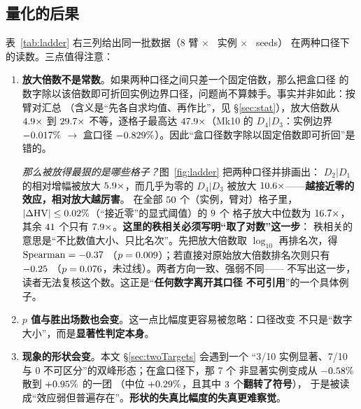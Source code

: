 \documentclass[UTF8, a4paper, 11pt]{ctexart}
\newcommand{\hv}{\mathrm{HV}}
\begin{document}
\subsection{量化的后果}\label{sec:boxeffect}
表~\ref{tab:ladder} 右三列给出同一批数据（8 臂 $\times$ \DevN\ 实例 $\times$ \SetSeeds\ seeds）
在两种口径下的读数。三点值得注意：

\begin{enumerate}\itemsep4pt
  \item \textbf{放大倍数不是常数}。如果两种口径之间只差一个固定倍数，那么把盒口径
        的数字除以该倍数即可折回实例边界口径，问题尚不算棘手。事实并非如此：按臂对汇总
        （含义是“先各自求均值、再作比”，见 \S\ref{sec:stat}），放大倍数从
        $4.9\times$ 到 $29.7\times$ 不等，逐格子最高达
        $47.9\times$（Mk10 的 $D_4|D_3$：实例边界 $-0.017\%$
        $\to$ 盒口径 $-0.829\%$）。因此“盒口径数字除以固定倍数即可折回”是错的。

        \emph{那么被放得最狠的是哪些格子？}图~\ref{fig:ladder} 把两种口径并排画出：
        $D_2|D_1$ 的相对增幅被放大 $5.9\times$，而几乎为零的 $D_4|D_3$
        被放大 $10.6\times$——\textbf{越接近零的效应，相对放大越厉害}。
        在全部 $50$ 个（实例，臂对）格子里，
        $|\Delta \hv|\le \CalibSmallThr\%$（“接近零”的显式阈值）的 $9$ 个
        格子放大中位数为 $16.7\times$，其余 $41$ 个只有
        $7.9\times$。\textbf{这里的秩相关必须写明“取了对数”这一步}：
        秩相关的意思是“不比数值大小、只比名次”。先把放大倍数取 $\log_{10}$
        再排名次，得 $\mathrm{Spearman}=-0.37$
        （$p=0.009$）；若直接对原始放大倍数排名次则只有 $-0.25$
        （$p=0.076$，未过线）。两者方向一致、强弱不同——
        不写出这一步，读者无法复核这个数。这正是“\textbf{任何数字离开其口径
        不可引用}”的一个具体例子。
  \item \textbf{$p$ 值与胜出场数也会变}。这一点比幅度更容易被忽略：口径改变
        不只是“数字大小”，而是\textbf{显著性判定本身}。
  \item \textbf{现象的形状会变}。本文 \S\ref{sec:twoTargets} 会遇到一个
        “3/10 实例显著、7/10 与 0 不可区分”的双峰形态；在盒口径下，那 7 个
        非显著实例变成从 $-0.58\%$ 散到 $+0.95\%$ 的一团
        （中位 $+0.29\%$，且其中 $3$ 个\textbf{翻转了符号}），
        于是被读成“效应弱但普遍存在”。\textbf{形状的失真比幅度的失真更难察觉}。
\end{enumerate}
\end{document}

